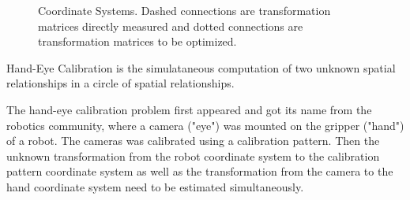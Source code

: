 \begin{figure}
\caption{Coordinate Systems. Dashed connections are transformation matrices directly measured and dotted connections are transformation matrices to be optimized.}
\label{fig:frame}
\end{figure}

Hand-Eye Calibration is the simulataneous computation of two unknown spatial relationships in a circle of spatial relationships.

The hand-eye calibration problem first appeared and got its name from the robotics community, where a camera ("eye") was mounted on the gripper ("hand") of a robot. The cameras was calibrated using a calibration pattern. Then the unknown transformation from the robot coordinate system to the calibration pattern coordinate system as well as the transformation from the camera to the hand coordinate system need to be estimated simultaneously.

